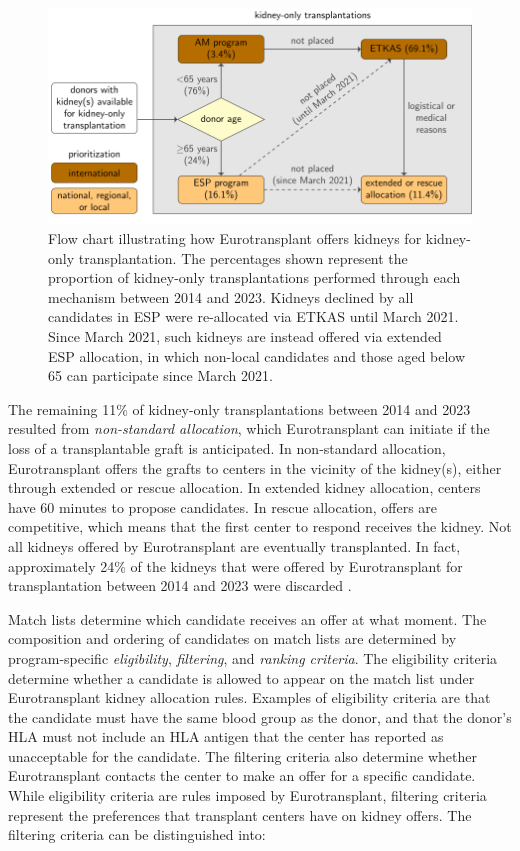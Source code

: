 \documentclass[11pt,twoside,]{book}
\begin{document}
\begin{figure}[h]

{\centering \includegraphics[width=0.96\linewidth]{figures/ch8//fig1-flowchart_kidney_allocation} 

}

\caption{Flow chart illustrating how Eurotransplant offers kidneys for kidney-only transplantation. The percentages shown represent the proportion of kidney-only transplantations performed through each mechanism between 2014 and 2023. Kidneys declined by all candidates in ESP were re-allocated via ETKAS until March 2021. Since March 2021, such kidneys are instead offered via extended ESP allocation, in which non-local candidates and those aged below 65 can participate since March 2021.}\label{fig:ch8fig1}
\end{figure}

The remaining 11\% of kidney-only transplantations between 2014 and 2023
resulted from \emph{non-standard allocation}, which Eurotransplant can initiate
if the loss of a transplantable graft is anticipated. In non-standard allocation,
Eurotransplant offers the grafts to centers in the vicinity of the kidney(s),
either through extended or rescue allocation. In extended kidney allocation, centers
have 60 minutes to propose candidates. In rescue allocation, offers are competitive,
which means that the first center to respond receives the kidney. Not all kidneys offered by
Eurotransplant are eventually transplanted.
In fact, approximately 24\% of the kidneys that were offered by Eurotransplant
for transplantation between 2014 and 2023 were discarded \citep{etreport_1132P}.

Match lists determine which candidate receives an offer at
what moment. The composition and ordering of
candidates on match lists are determined by program-specific
\emph{eligibility}, \emph{filtering}, and \emph{ranking criteria}. The eligibility
criteria determine whether a candidate is allowed to appear on the match list
under Eurotransplant kidney allocation rules. Examples of eligibility criteria are that the
candidate must have the same blood group as the donor, and that the donor's HLA
must not include an HLA antigen that the center has reported as unacceptable for
the candidate.
\newpage
The filtering criteria also determine whether Eurotransplant contacts
the center to make an offer for a specific candidate. While eligibility criteria
are rules imposed by Eurotransplant, filtering criteria represent the preferences
that transplant centers have on kidney offers.
The filtering criteria can be distinguished into:
\end{document}
